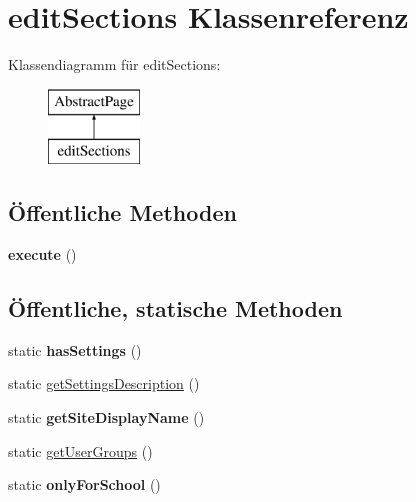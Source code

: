\hypertarget{classedit_sections}{}\section{edit\+Sections Klassenreferenz}
\label{classedit_sections}
Klassendiagramm für edit\+Sections\+:\begin{figure}[H]
\begin{center}
\leavevmode
\includegraphics[height=2.000000cm]{classedit_sections}
\end{center}
\end{figure}
\subsection*{Öffentliche Methoden}
\begin{DoxyCompactItemize}
\item 
\mbox{\label{classedit_sections_a67550490ccc2fbb502e3c8394dc5d771}} 
{\bfseries execute} ()
\end{DoxyCompactItemize}
\subsection*{Öffentliche, statische Methoden}
\begin{DoxyCompactItemize}
\item 
\mbox{\label{classedit_sections_a79da109f0647f4a523040aa5555244c3}} 
static {\bfseries has\+Settings} ()
\item 
static \mbox{\hyperlink{classedit_sections_a23c63defcab63087e6a6a3b176a04753}{get\+Settings\+Description}} ()
\item 
\mbox{\label{classedit_sections_acc58fdfd0a68addc6b55dd134c7aa65e}} 
static {\bfseries get\+Site\+Display\+Name} ()
\item 
static \mbox{\hyperlink{classedit_sections_a8a701b162fbc736eb49b94253fd021dc}{get\+User\+Groups}} ()
\item 
\mbox{\label{classedit_sections_a3a8cc3911103a2c5e4585690440c9d0c}} 
static {\bfseries only\+For\+School} ()
\end{DoxyCompactItemize}
